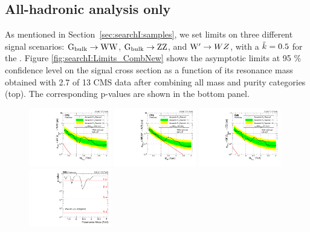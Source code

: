 \subsection{All-hadronic analysis only}
\label{sec:searchI:results4q}
As mentioned in Section~\ref{sec:searchI:samples}, we set limits on three different signal scenarios: $\mathrm{G}_\mathrm{bulk} \rightarrow \mathrm{W}\mathrm{W}$, $\mathrm{G}_\mathrm{bulk} \rightarrow \mathrm{Z}\mathrm{Z}$, and $\mathrm{W}^\prime \rightarrow WZ$, with a $\tilde{k} = 0.5$ for the \BulkG. Figure \ref{fig:searchI:Limits_CombNew} shows the asymptotic limits at 95 \% confidence level on the signal cross section as a function of its resonance mass obtained with 2.7 \fbinv of 13 \TeV CMS data after combining all mass and purity categories (top). The corresponding p-values are shown in the bottom panel.
\begin{figure}[h!]
\centering
\includegraphics[width=0.32\textwidth]{figures/analysis/search1/AN-15-211/limits/brazilianFlag_BulkWW_new_combined_13TeV.pdf}
\includegraphics[width=0.32\textwidth]{figures/analysis/search1/AN-15-211/limits/brazilianFlag_WZ_new_combined_13TeV.pdf}
\includegraphics[width=0.32\textwidth]{figures/analysis/search1/AN-15-211/limits/brazilianFlag_BulkZZ_new_combined_13TeV.pdf}\\
\includegraphics[width=0.32\textwidth]{figures/analysis/search1/AN-15-211/pvalues/pvalue_BulkWWin_combined_new.pdf}

\end{figure}
